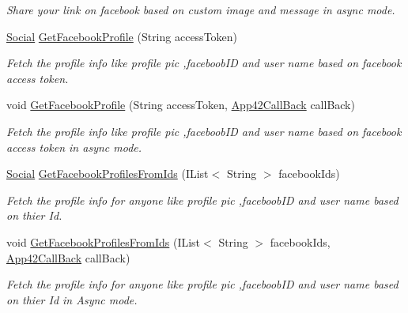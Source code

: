 \begin{DoxyCompactItemize}
\begin{DoxyCompactList}\small\item\em Share your link on facebook based on custom image and message in async mode. \end{DoxyCompactList}\item 
\hyperlink{classcom_1_1shephertz_1_1app42_1_1paas_1_1sdk_1_1csharp_1_1social_1_1_social}{Social} \hyperlink{classcom_1_1shephertz_1_1app42_1_1paas_1_1sdk_1_1csharp_1_1social_1_1_social_service_a9b0ef398eb6f644b305ce3fa56ca0f98}{Get\+Facebook\+Profile} (String access\+Token)
\begin{DoxyCompactList}\small\item\em Fetch the profile info like profile pic ,faceboob\+I\+D and user name based on facebook access token. \end{DoxyCompactList}\item 
void \hyperlink{classcom_1_1shephertz_1_1app42_1_1paas_1_1sdk_1_1csharp_1_1social_1_1_social_service_a38ad158121be84c48bb356468dfd3aa2}{Get\+Facebook\+Profile} (String access\+Token, \hyperlink{interfacecom_1_1shephertz_1_1app42_1_1paas_1_1sdk_1_1csharp_1_1_app42_call_back}{App42\+Call\+Back} call\+Back)
\begin{DoxyCompactList}\small\item\em Fetch the profile info like profile pic ,faceboob\+I\+D and user name based on facebook access token in async mode. \end{DoxyCompactList}\item 
\hyperlink{classcom_1_1shephertz_1_1app42_1_1paas_1_1sdk_1_1csharp_1_1social_1_1_social}{Social} \hyperlink{classcom_1_1shephertz_1_1app42_1_1paas_1_1sdk_1_1csharp_1_1social_1_1_social_service_a4db07d30b7eb4980c9b1646de0594d82}{Get\+Facebook\+Profiles\+From\+Ids} (I\+List$<$ String $>$ facebook\+Ids)
\begin{DoxyCompactList}\small\item\em Fetch the profile info for anyone like profile pic ,faceboob\+I\+D and user name based on thier Id. \end{DoxyCompactList}\item 
void \hyperlink{classcom_1_1shephertz_1_1app42_1_1paas_1_1sdk_1_1csharp_1_1social_1_1_social_service_a496450e80594e404547947de9c6f3b0b}{Get\+Facebook\+Profiles\+From\+Ids} (I\+List$<$ String $>$ facebook\+Ids, \hyperlink{interfacecom_1_1shephertz_1_1app42_1_1paas_1_1sdk_1_1csharp_1_1_app42_call_back}{App42\+Call\+Back} call\+Back)
\begin{DoxyCompactList}\small\item\em Fetch the profile info for anyone like profile pic ,faceboob\+I\+D and user name based on thier Id in Async mode. \end{DoxyCompactList}\end{DoxyCompactItemize}
